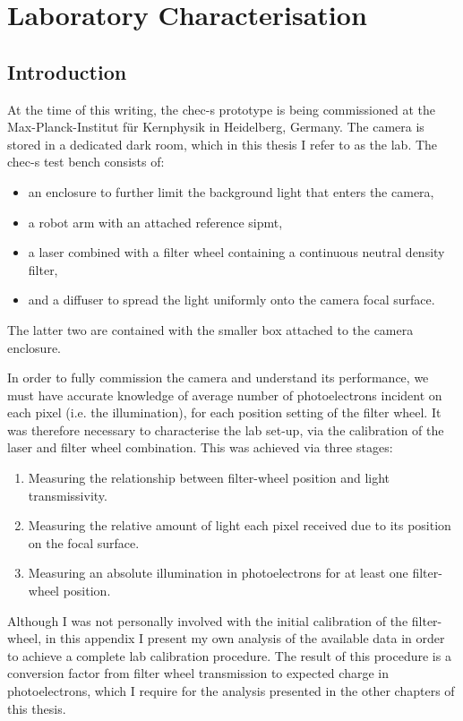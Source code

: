 \chapter{\label{a2-lab}Laboratory Characterisation}

\minitoc

\section{Introduction}

At the time of this writing, the \gls{chec-s} prototype is being commissioned at the Max-Planck-Institut für Kernphysik in Heidelberg, Germany. The camera is stored in a dedicated dark room, which in this thesis I refer to as the lab. The \gls{chec-s} test bench consists of: 
\begin{itemize}
\item an enclosure to further limit the background light that enters the camera,
\item a robot arm with an attached reference \gls{sipmt},
\item a laser combined with a filter wheel containing a continuous neutral density filter,
\item and a diffuser to spread the light uniformly onto the camera focal surface.
\end{itemize}
The latter two are contained with the smaller box attached to the camera enclosure.

In order to fully commission the camera and understand its performance, we must have accurate knowledge of average number of photoelectrons incident on each pixel (i.e. the illumination), for each position setting of the filter wheel. It was therefore necessary to characterise the lab set-up, via the calibration of the laser and filter wheel combination. This was achieved via three stages:
\begin{enumerate}
\item Measuring the relationship between filter-wheel position and light transmissivity.
\item Measuring the relative amount of light each pixel received due to its position on the focal surface.
\item Measuring an absolute illumination in photoelectrons for at least one filter-wheel position.
\end{enumerate}
Although I was not personally involved with the initial calibration of the filter-wheel, in this appendix I present my own analysis of the available data in order to achieve a complete lab calibration procedure. The result of this procedure is a conversion factor from filter wheel transmission to expected charge in photoelectrons, which I require for the analysis presented in the other chapters of this thesis.

